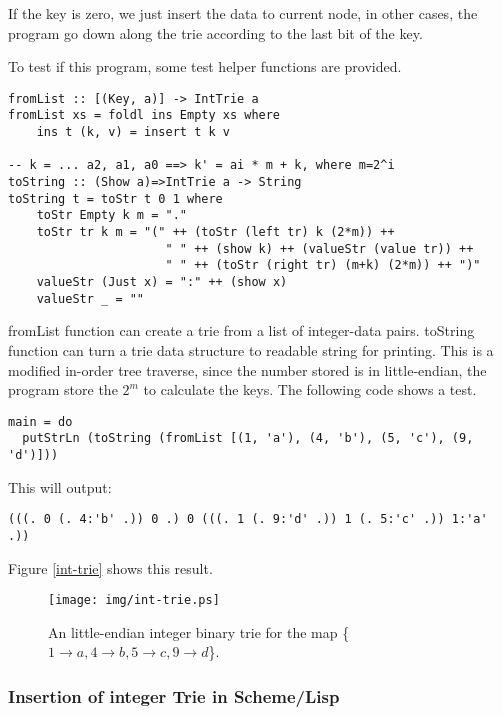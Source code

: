 \documentclass{article}
\begin{document}
If the key is zero, we just insert the data to current node, in other
cases, the program go down along the trie according to the last bit
of the key.

To test if this program, some test helper functions are provided.

\begin{lstlisting}
fromList :: [(Key, a)] -> IntTrie a
fromList xs = foldl ins Empty xs where
    ins t (k, v) = insert t k v

-- k = ... a2, a1, a0 ==> k' = ai * m + k, where m=2^i
toString :: (Show a)=>IntTrie a -> String
toString t = toStr t 0 1 where
    toStr Empty k m = "."
    toStr tr k m = "(" ++ (toStr (left tr) k (2*m)) ++
                      " " ++ (show k) ++ (valueStr (value tr)) ++
                      " " ++ (toStr (right tr) (m+k) (2*m)) ++ ")"
    valueStr (Just x) = ":" ++ (show x)
    valueStr _ = ""
\end{lstlisting}

fromList function can create a trie from a list of integer-data pairs.
toString function can turn a trie data structure to readable string
for printing. This is a modified in-order tree traverse, since the number
stored is in little-endian, the program store the $2^m$ to calculate
the keys. The following code shows a test.

\begin{lstlisting}
main = do
  putStrLn (toString (fromList [(1, 'a'), (4, 'b'), (5, 'c'), (9, 'd')]))
\end{lstlisting}

This will output:
\begin{verbatim}
(((. 0 (. 4:'b' .)) 0 .) 0 (((. 1 (. 9:'d' .)) 1 (. 5:'c' .)) 1:'a' .))
\end{verbatim}

Figure \ref{int-trie} shows this result. 
\begin{figure}[htbp]
       \begin{center}
	\texttt{[image: img/int-trie.ps]}
        \caption{An little-endian integer binary trie for the map 
          \{$ 1 \rightarrow a, 4 \rightarrow b, 5 \rightarrow c, 9 \rightarrow d$\}.} 
        \label{fig:int-trie}
       \end{center}
\end{figure}

\subsubsection*{Insertion of integer Trie in Scheme/Lisp}
\end{document}
